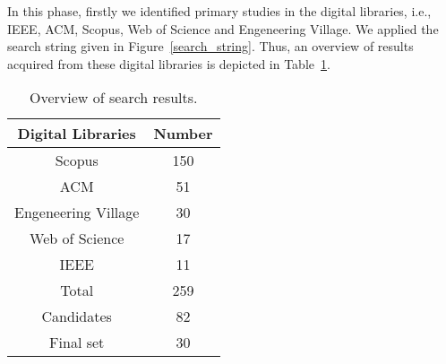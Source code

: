 %

In this phase, firstly we identified primary studies in the digital libraries, i.e., IEEE, ACM, Scopus, Web of Science and Engeneering Village. We applied the search string given in Figure~\ref{search_string}. Thus, an overview of results acquired from these digital libraries is depicted in Table~\ref{result_digital}.

\begin{table}[!h]
\centering
\caption{Overview of search results.}
\begin{tabular}{|c|c|}
\hline 
\cellcolor{gray}Digital Libraries & \cellcolor{gray}Number\tabularnewline
\hline 
\hline 
Scopus & 150\tabularnewline
\hline 
ACM & 51\tabularnewline
\hline 
Engeneering Village & 30\tabularnewline
\hline 
Web of Science & 17\tabularnewline
\hline 
IEEE & 11\tabularnewline
\hline 
\cellcolor{gray!25}Total & \cellcolor{gray!25}259\tabularnewline
\hline 
\cellcolor{gray!25}Candidates & \cellcolor{gray!25}82\tabularnewline
\hline 
\cellcolor{gray!25}Final set & \cellcolor{gray!25}30\tabularnewline
\hline 
\end{tabular}
\label{result_digital}
\end{table} 


